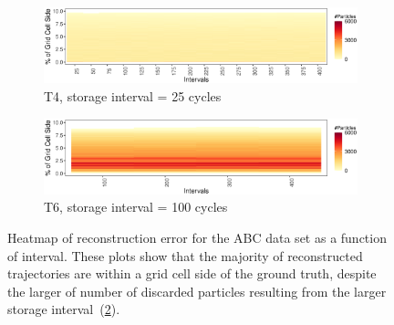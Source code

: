 \begin{figure}[!t]
\begin{subfigure}{\linewidth}
\centering
\includegraphics[width=\linewidth]{Images/ABC_Intervals_T4.eps}
\vspace{-5mm}
\caption{T4, storage interval = 25 cycles}
\label{fig:abc_4}
\end{subfigure}
\begin{subfigure}{\linewidth}
\centering
\includegraphics[width=\linewidth]{Images/ABC_Intervals_T6.eps}
\vspace{-5mm}
\caption{T6, storage interval = 100 cycles}
\label{fig:abc_6}
\end{subfigure}
\caption{{Heatmap of reconstruction error for the ABC data set as a function of interval. These plots show that the majority of reconstructed trajectories are within a grid cell side of the ground truth, despite the larger of number of discarded particles resulting from the larger storage interval~(\ref{fig:abc_6}).}}
\vspace{-1mm}
\label{fig:abc_map}
\end{figure}
